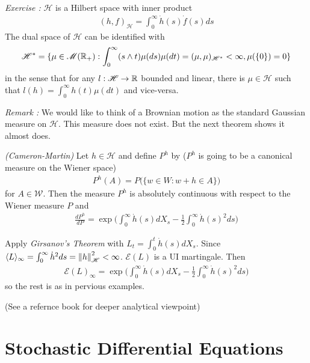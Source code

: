 \documentclass[12pt,a4paper]{article}
\newenvironment{proof}
{\begin{changemargin}{0.5cm}{0.5cm} 
	}%
	{\end{changemargin}
}
\newenvironment{p}
{\begin{proof} 
	}%
	{\end{proof}
}
\begin{document}
\emph{Exercise :} $\mathscr{H}$ is a Hilbert space with inner product
\begin{align*}
(h, f)_{\mathscr{H}} = \int_0^{\infty} \dot{h}(s)\dot{f}(s) ds
\end{align*} 
The dual space of $\mathscr{H}$ can be identified with
\begin{align*}
\mathscr{H}^* = \{\mu \in \mathscr{M}(\mathbb{R}_+) : \int_0^{\infty }(s\wedge t)\mu(ds) \mu(dt) = (\mu, \mu)_{\mathscr{H}^*}< \infty, \mu(\{0\})=0\}
\end{align*}
in the sense that for any $l: \mathscr{H} \rightarrow \mathbb{R}$ bounded and linear, there is $\mu \in \mathscr{H}$ such that $l(h) = \int_0^{\infty} h(t) \mu(dt)$ and vice-versa.
\s

\emph{Remark :} We would like to think of a Brownian motion as the standard Gaussian measure on $\mathscr{H}$. This measure does not exist. But the next theorem shows it almost does.
\s

\thm \emph{(Cameron-Martin)} Let $h\in \mathscr{H}$ and define $P^h$ by ($P^h$ is going to be a canonical measure on the Wiener space)
\begin{align*}
P^h(A) = P \big( \{ w\in W : w+ h \in A \} \big)
\end{align*}
for $A\in \mathscr{W}$. Then the measure $P^h$ is absolutely continuous with respect to the Wiener measure $P$ and
\begin{align*}
\frac{dP^h}{dP} = \exp \Big( \int_0^{\infty} \dot{h}(s) dX_s - \frac{1}{2}\int_0^{\infty} \dot{h}(s)^2 ds \Big)
\end{align*}
\begin{p}
\pf Apply \emph{Girsanov's Theorem} with $L_t = \int_0^{t} \dot{h}(s) dX_s$. Since $\langle L \rangle_{\infty} = \int_0^{\infty} \dot{h}^2 ds = \snorms{h}{\mathscr{H}}^2 < \infty$. $\mathscr{E}(L)$ is a UI martingale. Then
\begin{align*}
\mathscr{E}(L)_{\infty} = \exp \Big( \int_0^{\infty} \dot{h}(s) dX_s - \frac{1}{2}\int_0^{\infty} \dot{h}(s)^2 ds \Big)
\end{align*}
so the rest is as in pervious examples.

\eop
\end{p}

(See a refernce book for deeper analytical viewpoint)


\section{Stochastic Differential Equations}
\end{document}
